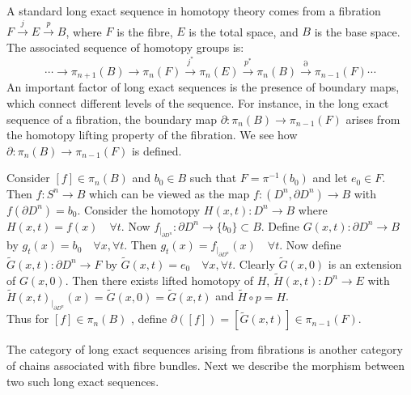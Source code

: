 \documentclass{amsart}
\theoremstyle{plain}
\begin{document}
A standard long exact sequence in homotopy theory comes from a fibration $F\stackrel{j}{\rightarrow} E \stackrel{p}{\rightarrow} B$, where $F$ is the fibre, $E$ is the total space, and $B$ is the base space. The associated sequence of homotopy groups is:
$$ \cdots  \longrightarrow \pi_{n+1}(B)   \longrightarrow \pi_n(F)   \stackrel{j^*}\longrightarrow \pi_n(E) \stackrel{p^*} \longrightarrow \pi_n(B) \stackrel{\partial} \longrightarrow \pi_{n-1}(F) \cdots$$ 
An important factor of long exact sequences is the presence of boundary maps, which connect different levels of the sequence. For instance, in the long exact sequence of a fibration, the boundary map $\partial : \pi_{n}(B)   \longrightarrow \pi_{n-1}(F)$ arises from the homotopy lifting property of the fibration.
We see how $\partial : \pi_n(B) \rightarrow \pi_{n-1}(F)$ is defined. 

Consider $[f] \in \pi_n(B)$ and $b_0 \in B$ such that $F= \pi^{-1}(b_0)$ and let $e_0 \in F$.  Then $f: S^n \rightarrow B$ which can be viewed as the map $f: (D^n, \partial D^n) \rightarrow B$ with $f(\partial D^n)= b_0$. Consider the homotopy $H(x,t):D^n \rightarrow B $ where $ H(x,t) = f(x) \quad \forall t$. Now $f_{|_{\partial{D^n}}} : \partial{D^n} \rightarrow \{b_0\} \subset B$. Define $G(x,t): \partial{D^n} \rightarrow  B$ by $g_t(x) = b_0 \quad \forall x, \forall t$. Then  $g_t(x) = f_{|_{\partial{D^n}}}(x)  \quad \forall t $. Now define $\tilde{G}(x,t):\partial D^n \rightarrow F $ by $\tilde{G}(x,t) = e_0 \quad \forall x, \forall t$. Clearly $\tilde{G}(x,0)$ is an extension of ${G}(x,0)$. Then there exists lifted homotopy of $H$, $\tilde{H}(x,t): D^n \rightarrow E $  with $\tilde{H}(x,t)_{|_{\partial{D^n}}}(x) = \tilde{G}(x,0) = \tilde{G}(x,t)$ and $\tilde{H} \circ p = H$.\\
Thus for $[f] \in \pi_n(B)$ , define $\partial([f])= [\tilde{G}(x,t)] \in \pi_{n-1}(F)$.



The category of long exact sequences arising from fibrations is another category of chains associated with fibre bundles.
Next we describe the morphism between two such long exact sequences.
\end{document}
